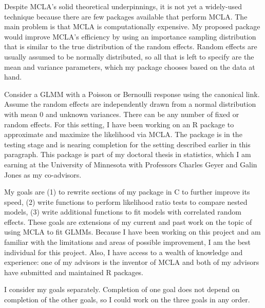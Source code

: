 \documentclass[12pt]{article}
\begin{document}
Despite MCLA's solid theoretical underpinnings, it is not yet a widely-used technique because there are  few packages available that perform MCLA.  The main problem is that MCLA is  computationally expensive. My proposed package would improve MCLA's efficiency by using an importance sampling distribution that is similar to the true distribution of the random effects.  Random effects are usually assumed to be normally distributed, so all that is left to specify are the mean and variance parameters, which my  package chooses  based on the data at hand.
 




Consider a GLMM with a Poisson or Bernoulli response using the canonical link.  Assume the random effects are independently drawn from a normal distribution with mean 0 and unknown variances. There can be any number of fixed or random effects.  For this setting, I have been working on an R package to approximate and maximize the likelihood via MCLA.   The package is in the testing stage and is nearing completion for the setting described earlier in this paragraph.  This package is part of my doctoral thesis in statistics, which I am earning at the University of Minnesota with Professors Charles Geyer and Galin Jones as my co-advisors.




My goals are  (1) to rewrite sections of my package in C to further improve its speed, (2) write functions to perform likelihood ratio tests to compare nested models, (3) write additional functions to fit models with correlated random effects.  These goals are extensions of my current and past work on the topic of using MCLA to fit GLMMs.  Because I have been working on this project and am familiar with the limitations and areas of possible improvement, I am the best individual for this project.  Also, I have access to a wealth of knowledge and experience: one of my advisors is the inventor of MCLA and both of my advisors have submitted and maintained R packages.




I consider my  goals separately. Completion of one goal does not depend on completion of the other goals, so I could work on the three goals in any order.
\end{document}

